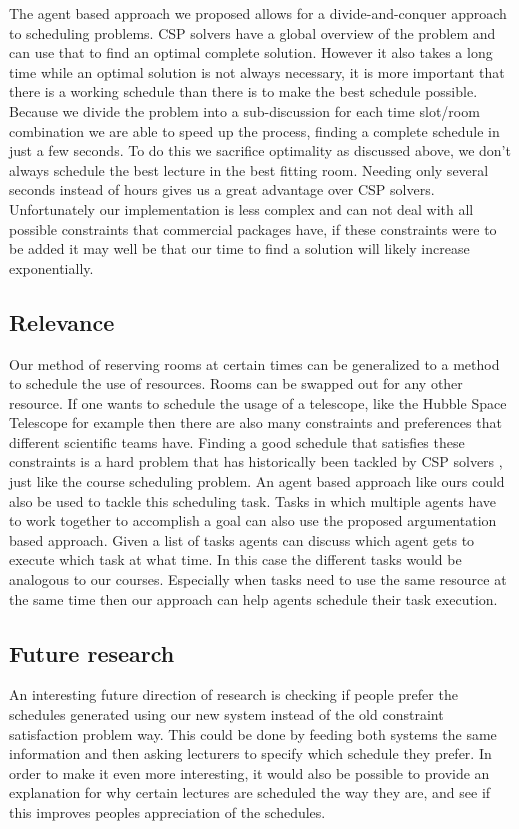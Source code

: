The agent based approach we proposed allows for a divide-and-conquer approach to
scheduling problems. CSP solvers have a global overview of the problem and can
use that to find an optimal complete solution. However it also takes a long time
while an optimal solution is not always necessary, it is more important that
there is a working schedule than there is to make the best schedule possible.
Because we divide the problem into a sub-discussion for each time slot/room
combination we are able to speed up the process, finding a complete schedule in
just a few seconds. To do this we sacrifice optimality as discussed above, we
don't always schedule the best lecture in the best fitting room. Needing only
several seconds instead of hours gives us a great advantage over CSP solvers.
Unfortunately our implementation is less complex and can not deal with all
possible constraints that commercial packages have, if these constraints were to
be added it may well be that our time to find a solution will likely increase
exponentially.

\subsection{Relevance}
Our method of reserving rooms at certain times can be generalized to a method to
schedule the use of resources. Rooms can be swapped out for any other resource.
If one wants to schedule the usage of a telescope, like the Hubble Space
Telescope for example then there are also many constraints and preferences that
different scientific teams have. Finding a good schedule that satisfies these
constraints is a hard problem that has historically been tackled by CSP solvers
\cite{johnston1994spike}, just like the course scheduling problem. An agent
based approach like ours could also be used to tackle this scheduling task.
Tasks in which multiple agents have to work together to accomplish a goal can
also use the proposed argumentation based approach. Given a list of tasks agents
can discuss which agent gets to execute which task at what time. In this case
the different tasks would be analogous to our courses. Especially when tasks
need to use the same resource at the same time then our approach can help agents
schedule their task execution.

\subsection{Future research}
An interesting future direction of research is checking if people prefer
the schedules generated using our new system instead of the old constraint
satisfaction problem way. This could be done by feeding both systems
the same information and then asking lecturers to specify which schedule
they prefer. In order to make it even more interesting, it would also be
possible to provide an explanation for why certain lectures are scheduled
the way they are, and see if this improves peoples appreciation of the
schedules.


